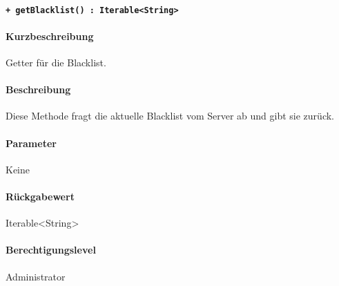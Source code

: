 \paragraph{\texttt{+ getBlacklist() : Iterable<String>}}\label{AP_Backend_getBlacklist}%
\paragraph*{Kurzbeschreibung}
Getter für die Blacklist.
\paragraph*{Beschreibung}
Diese Methode fragt die aktuelle Blacklist vom Server ab und gibt sie zurück.
\paragraph*{Parameter}
Keine
\paragraph*{Rückgabewert}
Iterable<String>
\paragraph*{Berechtigungslevel}
Administrator